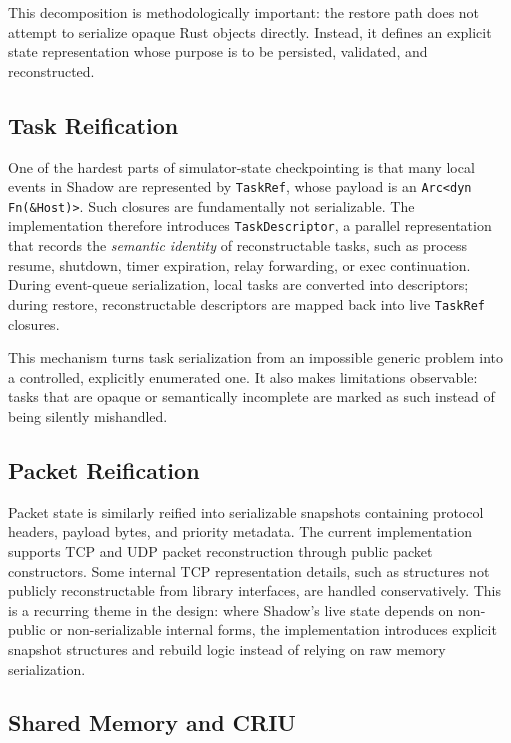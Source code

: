 \documentclass[11pt,a4paper]{article}
\begin{document}
This decomposition is methodologically important: the restore path does not
attempt to serialize opaque Rust objects directly. Instead, it defines an
explicit state representation whose purpose is to be persisted, validated, and
reconstructed.

\subsection{Task Reification}

One of the hardest parts of simulator-state checkpointing is that many local
events in Shadow are represented by \texttt{TaskRef}, whose payload is an
\texttt{Arc<dyn Fn(\&Host)>}. Such closures are fundamentally not serializable.
The implementation therefore introduces \texttt{TaskDescriptor}, a parallel
representation that records the \emph{semantic identity} of reconstructable
tasks, such as process resume, shutdown, timer expiration, relay forwarding,
or exec continuation. During event-queue serialization, local tasks are
converted into descriptors; during restore, reconstructable descriptors are
mapped back into live \texttt{TaskRef} closures.

This mechanism turns task serialization from an impossible generic problem
into a controlled, explicitly enumerated one. It also makes limitations
observable: tasks that are opaque or semantically incomplete are marked as
such instead of being silently mishandled.

\subsection{Packet Reification}

Packet state is similarly reified into serializable snapshots containing
protocol headers, payload bytes, and priority metadata. The current
implementation supports TCP and UDP packet reconstruction through public packet
constructors. Some internal TCP representation details, such as structures not
publicly reconstructable from library interfaces, are handled conservatively.
This is a recurring theme in the design: where Shadow's live state depends on
non-public or non-serializable internal forms, the implementation introduces
explicit snapshot structures and rebuild logic instead of relying on raw
memory serialization.

\subsection{Shared Memory and CRIU}
\end{document}
